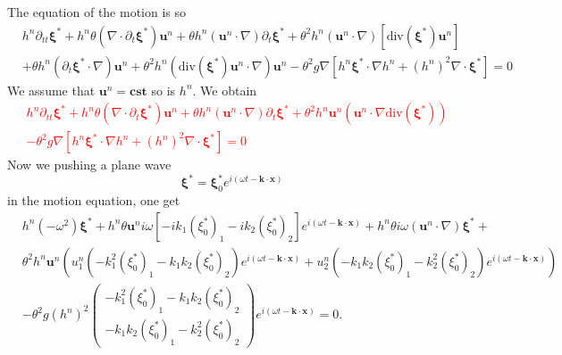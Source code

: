 \documentclass[a4paper, 11pt]{article}
\begin{document}
The equation of the motion is so
\begin{equation*}
\begin{split}
&h^n\partial_{tt}\boldsymbol{\xi}^*+h^n\theta(\nabla \cdot \partial_t \boldsymbol{\xi}^*)\boldsymbol{u}^n+\theta h^n\left(\boldsymbol{u}^n\cdot \nabla \right)\partial_t \boldsymbol{\xi}^*+\theta^2h^n\left(\boldsymbol{u}^n\cdot \nabla \right)\left[\text{div}(\boldsymbol{\xi}^*)\boldsymbol{u}^n\right]\\
&+\theta h^n\left(\partial_t \boldsymbol{\xi}^*\cdot \nabla\right)\boldsymbol{u}^n+\theta^2h^n\left(\text{div}( \boldsymbol{\xi}^*)\boldsymbol{u}^n\cdot \nabla \right)\boldsymbol{u}^n-\theta^2g\nabla \left[h^n\boldsymbol{\xi}^*\cdot \nabla h^n+(h^n)^2\nabla \cdot \boldsymbol{\xi}^*\right]=0
\end{split}
\end{equation*}
We assume that $\boldsymbol{u}^n=\boldsymbol{cst}$ so is $h^n$. We obtain
\textcolor{red}{
\begin{equation*}
\begin{split}
&h^n\partial_{tt}\boldsymbol{\xi}^*+h^n\theta(\nabla \cdot \partial_t \boldsymbol{\xi}^*)\boldsymbol{u}^n+\theta h^n\left(\boldsymbol{u}^n\cdot \nabla \right)\partial_t \boldsymbol{\xi}^*+\theta^2h^n\boldsymbol{u}^n \left(\boldsymbol{u}^n\cdot \nabla \text{div}(\boldsymbol{\xi}^*)\right) \\
&-\theta^2g\nabla \left[h^n\boldsymbol{\xi}^*\cdot \nabla h^n+(h^n)^2\nabla \cdot \boldsymbol{\xi}^*\right]=0
\end{split}
\end{equation*}
}
Now we pushing a plane wave 
\begin{equation*}
\boldsymbol{\xi}^*=\boldsymbol{\xi}_0^*e^{i(\omega t-\boldsymbol{k}\cdot \boldsymbol{x})}
\end{equation*}
in the motion equation, one get
\begin{equation*}
\begin{split}
&h^n(-\omega^2)\boldsymbol{\xi}^*+h^n\theta\boldsymbol{u}^ni\omega\left[-ik_1(\xi_0^*)_1-ik_2(\xi_0^*)_2\right]e^{i(\omega t-\boldsymbol{k}\cdot \boldsymbol{x})}+h^n\theta i\omega (\boldsymbol{u}^n\cdot \nabla)\boldsymbol{\xi}^*+\\
&\theta^2 h^n\boldsymbol{u}^n\left(u_1^n\left(-k_1^2(\xi_0^*)_1-k_1k_2(\xi_0^*)_2\right)e^{i(\omega t-\boldsymbol{k}\cdot \boldsymbol{x})}+u_2^n\left(-k_1k_2(\xi_0^*)_1-k_2^2(\xi_0^*)_2\right)e^{i(\omega t-\boldsymbol{k}\cdot \boldsymbol{x})}\right)\\
&-\theta^2g(h^n)^2\begin{pmatrix}-k_1^2(\xi_0^*)_1-k_1k_2(\xi_0^*)_2\\ -k_1k_2(\xi_0^*)_1-k_2^2(\xi_0^*)_2\end{pmatrix}e^{i(\omega t-\boldsymbol{k}\cdot \boldsymbol{x})}=0.
\end{split}
\end{equation*}
\end{document}
